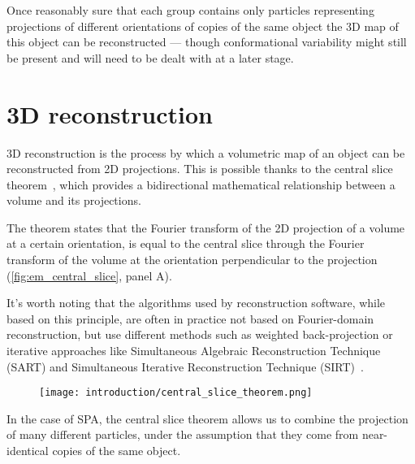 Once reasonably sure that each group contains only particles representing projections of different orientations of copies of the same object the 3D map of this object can be reconstructed --- though conformational variability might still be present and will need to be dealt with at a later stage.

\section{3D reconstruction}\label{em_reconstruction}

3D reconstruction is the process by which a volumetric map of an object can be reconstructed from 2D projections.
This is possible thanks to the central slice theorem~\cite{wikipediaProjectionsliceTheorem2023}, which provides a bidirectional mathematical relationship between a volume and its projections.

The theorem states that the Fourier transform of the 2D projection of a volume at a certain orientation, is equal to the central slice through the Fourier transform of the volume at the orientation perpendicular to the projection (\autoref{fig:em_central_slice}, panel A).

It's worth noting that the algorithms used by reconstruction software, while based on this principle, are often in practice not based on Fourier-domain reconstruction, but use different methods such as weighted back-projection or iterative approaches like Simultaneous Algebraic Reconstruction Technique (SART) and Simultaneous Iterative Reconstruction Technique (SIRT)~\cite{andersenSimultaneousAlgebraicReconstruction1984,agulleiroFastTomographicReconstruction2011,wikipediaTomographicReconstruction2024}.

\begin{figure}[ht]
    \centering
    \texttt{[image: introduction/central\_slice\_theorem.png]}
    \label{fig:em_central_slice}
\end{figure}

In the case of SPA, the central slice theorem allows us to combine the projection of many different particles, under the assumption that they come from near-identical copies of the same object.

